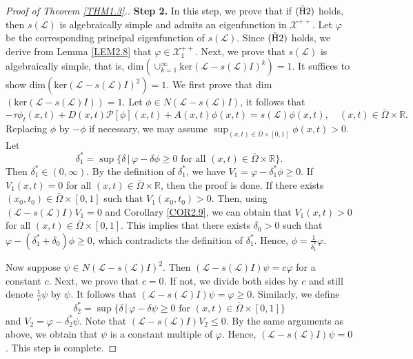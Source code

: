\documentclass[11pt,reqno]{amsart}
\numberwithin{equation}{section}
\begin{document}
\begin{proof}[Proof of Theorem \ref{THM1.3}.]
\textbf{Step 2.} In this step, we prove that if ${ \rm (\tilde{H}2) }$ holds, then $s(\mathcal{L})$ is algebraically simple and admits an eigenfunction in $\mathcal{X}^{++}$.
Let $\varphi$ be the corresponding principal eigenfunction of $s(\mathcal{L})$.
Since ${ \rm (\tilde{H}2) }$ holds, we derive from Lemma \ref{LEM2.8} that $\varphi \in \mathcal{X}_{1}^{++}$.
Next, we prove that $s(\mathcal{L})$ is algebraically simple, that is,
dim$\left(\cup_{k=1}^{\infty} \text{ker}(\mathcal{L} - s(\mathcal{L})I)^{k}\right) = 1$.
It suffices to show
dim$\left(\text{ker}(\mathcal{L}-s(\mathcal{L})I)^{2}\right)=1$.
We first prove that dim$\left(\text{ker}(\mathcal{L}-s(\mathcal{L})I)\right)=1$.
Let $\phi\in N(\mathcal{L}-s(\mathcal{L})I)$, it follows that
\begin{equation*}
-\tau\phi_{t}(x,t) + D(x,t)\mathcal{P}[\phi](x,t) + A(x,t)\phi(x,t) = s(\mathcal{L})\phi(x,t),\quad (x,t)\in \bar\Omega\times\mathbb{R}.
\end{equation*}
Replacing $\phi$ by $-\phi$ if necessary, we may assume
$\sup_{(x,t)\in\bar\Omega\times[0,1]}\phi(x,t)>0$.
Let
$$
\delta^{*}_{1} = \sup\{ \delta \,|\, \varphi-\delta \phi \geq 0 \text{ for all } (x,t)\in \bar\Omega\times\mathbb{R}  \}.
$$
Then $\delta_{1}^{*} \in (0,\infty)$.
By the definition of $\delta^{*}_{1}$, we have $V_{1} = \varphi-\delta^{*}_{1}\phi \geq 0$.
If $V_{1}(x,t)=0$ for all $(x,t)\in \bar{\Omega}\times \mathbb{R}$, then the proof is done.
If there exists $(x_{0},t_{0}) \in \bar{\Omega}\times [0,1]$  such that $V_{1}(x_{0},t_{0})>0$.
Then, using $(\mathcal{L} - s(\mathcal{L})I)V_{1}=0$ and Corollary \ref{COR2.9}, we can obtain that
$V_{1}(x,t)>0$ for all $(x,t)\in \bar{\Omega}\times [0,1]$.
This implies that there exists $\delta_{0}>0$ such that
$\varphi - (\delta^{*}_{1}+\delta_{0})\phi \geq 0$, which contradicts the definition of $\delta^{*}_{1}$.
Hence, $\phi = \frac{1}{\delta^{*}_{1}} \varphi$.


Now suppose $\psi\in N(\mathcal{L}-s(\mathcal{L})I)^{2}$. Then
$(\mathcal{L}-s(\mathcal{L})I)\psi=c\varphi$ for a constant $c$.
Next, we prove that $c=0$. If not, we divide both sides by $c$ and still denote $\frac{1}{c}\psi$ by $\psi$. It follows that $(\mathcal{L}-s(\mathcal{L})I)\psi=\varphi\geq 0$. Similarly, we define
$$\delta^{*}_{2} = \sup\{ \delta \,|\, \varphi-\delta \psi \geq 0 \text{ for } (x,t)\in \bar\Omega\times[0,1]  \} $$
and $V_{2}=\varphi-\delta^{*}_{2}\psi$.
Note that $(\mathcal{L} - s(\mathcal{L})I )V_{2} \leq 0$.
By the same arguments as above, we obtain that $\psi$ is a constant multiple of $\varphi$.
Hence, $(\mathcal{L}-s(\mathcal{L})I)\psi=0$. This step is complete.




\end{proof}
\end{document}
